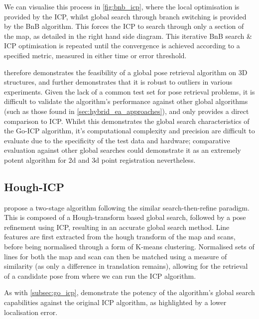 \documentclass[authoryearcitations]{UoYCSproject}
\begin{document}
We can visualise this process in \autoref{fig:bnb_icp}, where the local optimisation is provided by the ICP, whilst global search through branch switching is provided by the BnB algorithm. This forces the ICP to search through only a section of the map, as detailed in the right hand side diagram. This iterative BnB search \& ICP optimisation is repeated until the convergence is achieved according to a specified metric, measured in either time or error threshold. \newline

\citeauthor{Yang2013-gx} therefore demonstrates the feasibility of a global pose retrieval algorithm on 3D structures, and further demonstrates that it is robust to outliers in various experiments. Given the lack of a common test set for pose retrieval problems, it is difficult to validate the algorithm's performance against other global algorithms (such as those found in \autoref{sec:hybrid_ea_approaches}), and \citeauthor{Yang2013-gx} only provides a direct comparison to ICP. Whilst this demonstrates the global search characteristics of the Go-ICP algorithm, it's computational complexity and precision are difficult to evaluate due to the specificity of the test data and hardware; comparative evaluation against other global searches could demonstrate it as an extremely potent algorithm for 2d and 3d point registration nevertheless.
 
\subsection{Hough-ICP}
\label{subsec:hough_icp}

\citet{Ma2016-es} propose a two-stage algorithm following the similar search-then-refine paradigm. This is composed of a Hough-transform based global search, followed by a pose refinement using ICP, resulting in an accurate global search method. Line features are first extracted from the hough transform of the map and scans, before being normalised through a form of K-means clustering. Normalised sets of lines for both the map and scan can then be matched using a measure of similarity (as only a difference in translation remains), allowing for the retrieval of a candidate pose from where we can run the ICP algorithm. \newline

As with \autoref{subsec:go_icp}, \citeauthor{Ma2016-es} demonstrate the potency of the algorithm's global search capabilities against the original ICP algorithm, as highlighted by a lower localisation error. 
\end{document}
